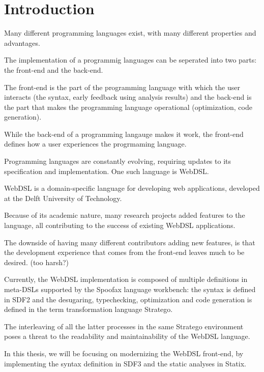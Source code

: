 
\chapter{\label{chap:introduction}Introduction}

  Many different programming languages exist, with many different properties and advantages.

  The implementation of a programmig languages can be seperated into two parts: the front-end and the back-end. 

  The front-end is the part of the programming language with which the user interacts (the syntax, early feedback using analysis results) and the back-end is the part that makes the programming language operational (optimization, code generation).

  While the back-end of a programming langauge makes it work, the front-end defines how a user experiences the progrmaming language. %

  Programming languages are constantly evolving, requiring updates to its specification and implementation. One such language is WebDSL.

  WebDSL is a domain-specific language for developing web applications, developed at the Delft University of Technology.

  Because of its academic nature, many research projects added features to the language, all contributing to the success of existing WebDSL applications.

  The downside of having many different contributors adding new features, is that the development experience that comes from the front-end leaves much to be desired. (too harsh?)

  Currently, the WebDSL implementation is composed of multiple definitions in meta-DSLs supported by the Spoofax language workbench: the syntax is defined in SDF2 and the desugaring, typechecking, optimization and code generation is defined in the term transformation language Stratego.

  The interleaving of all the latter processes in the same Stratego environment poses a threat to the readability and maintainability of the WebDSL language.

  In this thesis, we will be focusing on modernizing the WebDSL front-end, by implementing the syntax definition in SDF3 and the static analyses in Statix.

